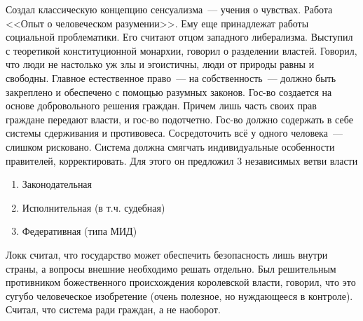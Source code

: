 Создал классическую концепцию сенсуализма~--- учения о чувствах. Работа <<Опыт о человеческом разумении>>. Ему еще принадлежат работы социальной проблематики. Его считают отцом западного либерализма. Выступил с теоретикой конституционной монархии, говорил о разделении властей. Говорил, что люди не настолько уж злы и эгоистичны, люди от природы равны и свободны. Главное естественное право~--- на собственность~--- должно быть  закреплено и обеспечено с помощью разумных законов. Гос-во создается на основе добровольного решения граждан. Причем лишь часть своих прав граждане передают власти, и гос-во подотчетно. Гос-во должно содержать в себе системы сдерживания и противовеса. Сосредоточить всё у одного человека~--- слишком рисковано. Система должна смягчать индивидуальные особенности правителей, корректировать. Для этого он предложил 3 независимых ветви власти
\begin{enumerate}
	\item Законодательная
	\item Исполнительная (в т.ч. судебная)
	\item Федеративная (типа МИД)
\end{enumerate}
	
Локк считал, что государство может обеспечить безопасность лишь внутри страны, а вопросы внешние необходимо решать отдельно. Был решительным противником божественного происхождения королевской власти, говорил, что это сугубо человеческое изобретение (очень полезное, но нуждающееся в контроле). Считал, что система ради граждан, а не наоборот.
